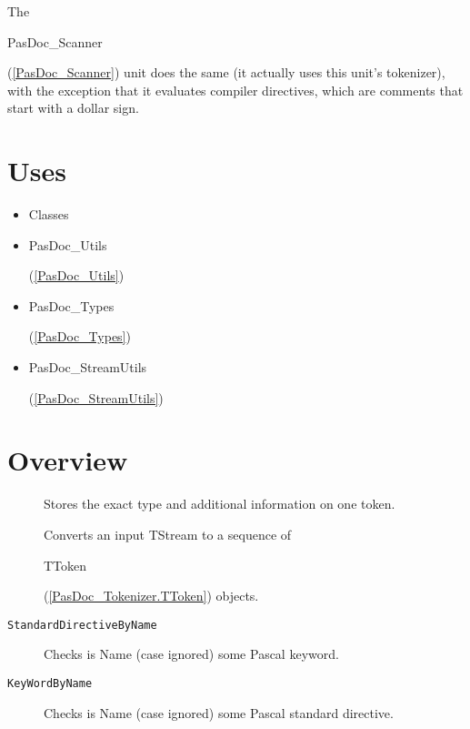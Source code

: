 \documentclass{report}
\begin{document}
The \begin{ttfamily}PasDoc{\_}Scanner\end{ttfamily}(\ref{PasDoc_Scanner}) unit does the same (it actually uses this unit's tokenizer), with the exception that it evaluates compiler directives, which are comments that start with a dollar sign.
\section{Uses}
\begin{itemize}
\item \begin{ttfamily}Classes\end{ttfamily}\item \begin{ttfamily}PasDoc{\_}Utils\end{ttfamily}(\ref{PasDoc_Utils})\item \begin{ttfamily}PasDoc{\_}Types\end{ttfamily}(\ref{PasDoc_Types})\item \begin{ttfamily}PasDoc{\_}StreamUtils\end{ttfamily}(\ref{PasDoc_StreamUtils})\end{itemize}
\section{Overview}
\begin{description}
\item[\texttt{\begin{ttfamily}TToken\end{ttfamily} Class}]Stores the exact type and additional information on one token.
\item[\texttt{\begin{ttfamily}TTokenizer\end{ttfamily} Class}]Converts an input TStream to a sequence of \begin{ttfamily}TToken\end{ttfamily}(\ref{PasDoc_Tokenizer.TToken}) objects.
\end{description}
\begin{description}
\item[\texttt{StandardDirectiveByName}]Checks is Name (case ignored) some Pascal keyword.
\item[\texttt{KeyWordByName}]Checks is Name (case ignored) some Pascal standard directive.
\end{description}
\end{document}
